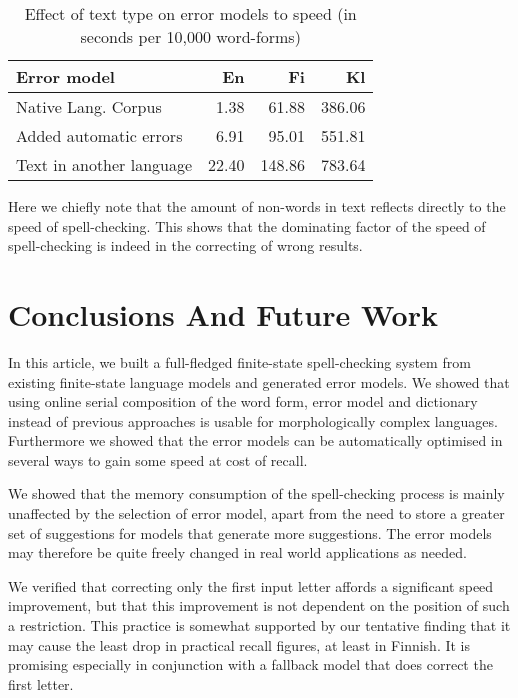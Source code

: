 \documentclass[11pt]{article}
\begin{document}
\begin{table}[h]
\begin{center}
\begin{scriptsize}
\begin{tabular}{|l|rrr|}
\hline
\bf Error model & \bf En & \bf Fi & \bf Kl  \\ 
\hline
Native Lang. Corpus &
1.38&61.88&386.06
\\
Added automatic errors &
6.91&95.01&551.81
\\
Text in another language &
22.40&148.86&783.64
\\
\hline
\end{tabular}
\end{scriptsize}
\end{center}
\caption{\label{table:language-vs-text-type} Effect of text type on
error models to speed (in seconds per 10,000 word-forms)}
\end{table}

Here we chiefly note that the amount of non-words in text reflects directly to
the speed of spell-checking. This shows that the dominating factor of the
speed of spell-checking is indeed in the correcting of wrong results.

\section{Conclusions And Future Work}
\label{sec:conclusions}

In this article, we built a full-fledged finite-state spell-checking system from
existing finite-state language models and generated error models. We showed
that using online serial composition of the word form, error model and
dictionary instead of previous approaches is usable for morphologically
complex languages. Furthermore
we showed that the error models can be automatically optimised in several ways
to gain some speed at cost of recall.

We showed that the memory consumption of the spell-checking process is mainly
unaffected by the selection of error model, apart from the need to store
a greater set of suggestions for models that generate more suggestions. The
error models may therefore be quite freely changed in real world
applications as needed.

We verified that correcting only the first input letter affords a significant
speed improvement, but that this improvement is not dependent on the position
of such a restriction. This practice is somewhat supported by our tentative
finding that it may cause the least drop in practical recall figures, at least
in Finnish. It is promising especially in conjunction with a fallback model
that does correct the first letter.
\end{document}
